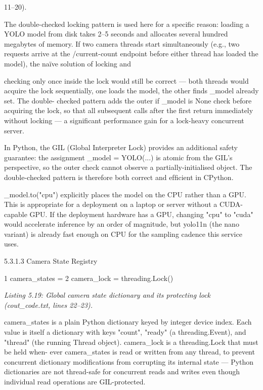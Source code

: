 11--20).


The double-checked locking pattern is used here for a speciﬁc reason: loading a
YOLO model from disk takes 2--5 seconds and allocates several hundred megabytes of
memory. If two camera threads start simultaneously (e.g., two requests arrive at the /current-count
endpoint before either thread has loaded the model), the naïve solution of locking and



checking only once inside the lock would still be correct --- both threads would acquire the
lock sequentially, one loads the model, the other ﬁnds \_model already set. The double-
checked pattern adds the outer if \_model is None check before acquiring the lock, so
that all subsequent calls after the ﬁrst return immediately without locking --- a signiﬁcant
performance gain for a lock-heavy concurrent server.

In Python, the GIL (Global Interpreter Lock) provides an additional safety guarantee:
the assignment \_model = YOLO(...) is atomic from the GIL's perspective, so the outer
check cannot observe a partially-initialised object. The double-checked pattern is therefore
both correct and efﬁcient in CPython.

\_model.to("cpu") explicitly places the model on the CPU rather than a GPU. This
is appropriate for a deployment on a laptop or server without a CUDA-capable GPU. If the
deployment hardware has a GPU, changing "cpu" to "cuda" would accelerate inference
by an order of magnitude, but yolo11n (the nano variant) is already fast enough on CPU
for the sampling cadence this service uses.


5.3.1.3 Camera State Registry

1 camera\_states = {}
2 camera\_lock = threading.Lock()


\textit{Listing 5.19: Global camera state dictionary and its protecting lock (cout\_code.txt, lines 22--23).}



camera\_states is a plain Python dictionary keyed by integer device index. Each
value is itself a dictionary with keys "count", "ready" (a threading.Event), and "thread"
(the running Thread object). camera\_lock is a threading.Lock that must be held when-
ever camera\_states is read or written from any thread, to prevent concurrent dictionary
modiﬁcations from corrupting its internal state --- Python dictionaries are not thread-safe
for concurrent reads and writes even though individual read operations are GIL-protected.



